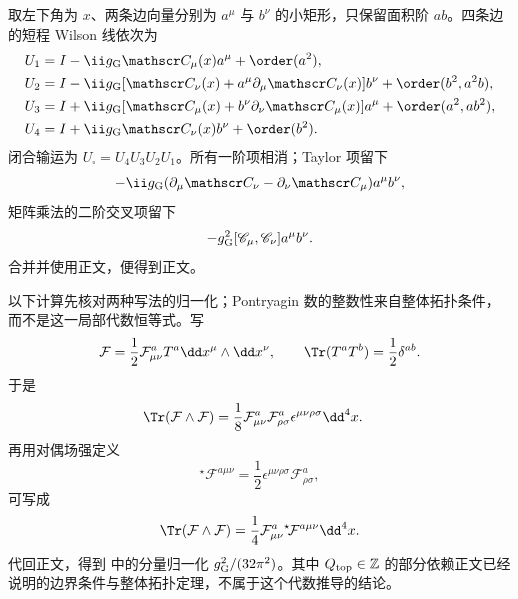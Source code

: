 \begin{derivation}
取左下角为 $x$、两条边向量分别为 $a^\mu$ 与 $b^\nu$ 的小矩形，只保留面积阶 $ab$。四条边的短程 Wilson 线依次为
\begin{align*}
 U_1&=I-\ii g_{\rm G}\mathscr C_\mu(x)a^\mu+\order(a^2),\\
 U_2&=I-\ii g_{\rm G}[\mathscr C_\nu(x)+a^\mu\partial_\mu\mathscr C_\nu(x)]b^\nu
 +\order(b^2,a^2b),\\
 U_3&=I+\ii g_{\rm G}[\mathscr C_\mu(x)+b^\nu\partial_\nu\mathscr C_\mu(x)]a^\mu
 +\order(a^2,ab^2),\\
 U_4&=I+\ii g_{\rm G}\mathscr C_\nu(x)b^\nu+\order(b^2).
\end{align*}
闭合输运为 $U_\square=U_4U_3U_2U_1$。所有一阶项相消；Taylor 项留下
\begin{equation*}
 -\ii g_{\rm G}(\partial_\mu\mathscr C_\nu-\partial_\nu\mathscr C_\mu)a^\mu b^\nu,
\end{equation*}
矩阵乘法的二阶交叉项留下
\begin{equation*}
 -g_{\rm G}^2[\mathscr C_\mu,\mathscr C_\nu]a^\mu b^\nu.
\end{equation*}
合并并使用正文，便得到正文。
\end{derivation}

\begin{derivation}
以下计算先核对两种写法的归一化；Pontryagin 数的整数性来自整体拓扑条件，而不是这一局部代数恒等式。写
\begin{equation*}
 \mathcal F=\frac12\mathcal F_{\mu\nu}^aT^a
 \dd x^\mu\wedge\dd x^\nu,
 \qquad
 \Tr(T^aT^b)=\frac12\delta^{ab}.
\end{equation*}
于是
\begin{align*}
 \Tr(\mathcal F\wedge\mathcal F)
 &=\frac18\mathcal F_{\mu\nu}^a\mathcal F_{\rho\sigma}^a
 \epsilon^{\mu\nu\rho\sigma}\dd^4 x.
\end{align*}
再用对偶场强定义
\begin{equation*}
 {}^\star\!\mathcal F^{a\mu\nu}
 =\frac12\epsilon^{\mu\nu\rho\sigma}\mathcal F_{\rho\sigma}^a,
\end{equation*}
可写成
\begin{equation*}
 \Tr(\mathcal F\wedge\mathcal F)
 =\frac14\mathcal F_{\mu\nu}^a
 {}^\star\!\mathcal F^{a\mu\nu}\dd^4 x.
\end{equation*}
代回正文，得到 中的分量归一化 $g_{\rm G}^2/(32\pi^2)$。其中 $Q_{\rm top}\in\mathbb Z$ 的部分依赖正文已经说明的边界条件与整体拓扑定理，不属于这个代数推导的结论。
\end{derivation}

